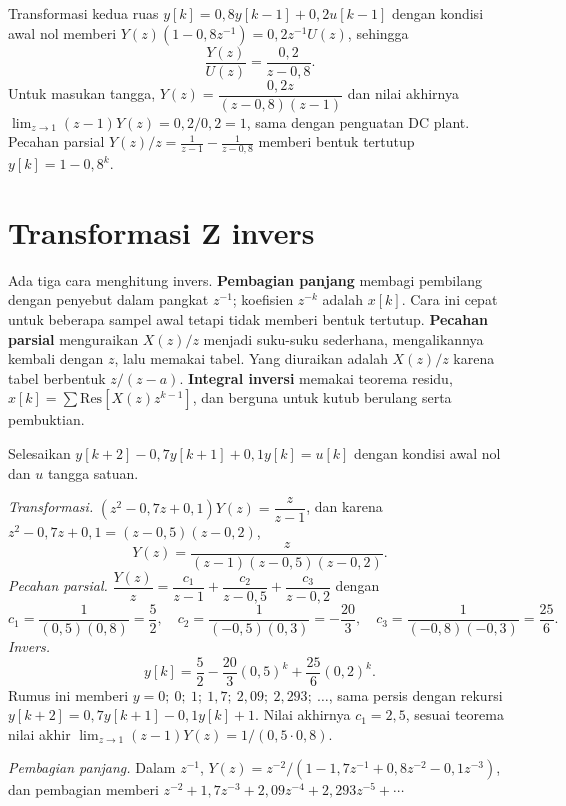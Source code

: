 \begin{contoh}
	Transformasi kedua ruas $y[k] = 0{,}8y[k-1] + 0{,}2u[k-1]$ dengan kondisi awal nol memberi $Y(z)(1 - 0{,}8z^{-1}) = 0{,}2z^{-1}U(z)$, sehingga
	\[
		\frac{Y(z)}{U(z)} = \frac{0{,}2}{z-0{,}8}.
	\]
	Untuk masukan tangga, $Y(z) = \dfrac{0{,}2z}{(z-0{,}8)(z-1)}$ dan nilai akhirnya $\lim_{z\to1}(z-1)Y(z) = 0{,}2/0{,}2 = 1$, sama dengan penguatan DC plant. Pecahan parsial $Y(z)/z = \frac{1}{z-1} - \frac{1}{z-0{,}8}$ memberi bentuk tertutup $y[k] = 1 - 0{,}8^k$.
\end{contoh}

\section{Transformasi Z invers}
Ada tiga cara menghitung invers. \textbf{Pembagian panjang} membagi pembilang dengan penyebut dalam pangkat $z^{-1}$; koefisien $z^{-k}$ adalah $x[k]$. Cara ini cepat untuk beberapa sampel awal tetapi tidak memberi bentuk tertutup. \textbf{Pecahan parsial} menguraikan $X(z)/z$ menjadi suku-suku sederhana, mengalikannya kembali dengan $z$, lalu memakai tabel. Yang diuraikan adalah $X(z)/z$ karena tabel berbentuk $z/(z-a)$. \textbf{Integral inversi} memakai teorema residu, $x[k] = \sum\text{Res}[X(z)z^{k-1}]$, dan berguna untuk kutub berulang serta pembuktian.

\begin{contoh}
	Selesaikan $y[k+2] - 0{,}7y[k+1] + 0{,}1y[k] = u[k]$ dengan kondisi awal nol dan $u$ tangga satuan.

	\textit{Transformasi.} $(z^2 - 0{,}7z + 0{,}1)Y(z) = \dfrac{z}{z-1}$, dan karena $z^2 - 0{,}7z + 0{,}1 = (z-0{,}5)(z-0{,}2)$,
	\[
		Y(z) = \frac{z}{(z-1)(z-0{,}5)(z-0{,}2)}.
	\]
	\textit{Pecahan parsial.} $\dfrac{Y(z)}{z} = \dfrac{c_1}{z-1} + \dfrac{c_2}{z-0{,}5} + \dfrac{c_3}{z-0{,}2}$ dengan
	\[
		c_1 = \frac{1}{(0{,}5)(0{,}8)} = \frac52,\quad c_2 = \frac{1}{(-0{,}5)(0{,}3)} = -\frac{20}{3},\quad c_3 = \frac{1}{(-0{,}8)(-0{,}3)} = \frac{25}{6}.
	\]
	\textit{Invers.}
	\[
		y[k] = \frac52 - \frac{20}{3}(0{,}5)^k + \frac{25}{6}(0{,}2)^k.
	\]
	Rumus ini memberi $y = 0;\ 0;\ 1;\ 1{,}7;\ 2{,}09;\ 2{,}293;\ \dots$, sama persis dengan rekursi $y[k+2] = 0{,}7y[k+1] - 0{,}1y[k] + 1$. Nilai akhirnya $c_1 = 2{,}5$, sesuai teorema nilai akhir $\lim_{z\to1}(z-1)Y(z) = 1/(0{,}5 \cdot 0{,}8)$.

	\textit{Pembagian panjang.} Dalam $z^{-1}$, $Y(z) = z^{-2}/(1 - 1{,}7z^{-1} + 0{,}8z^{-2} - 0{,}1z^{-3})$, dan pembagian memberi $z^{-2} + 1{,}7z^{-3} + 2{,}09z^{-4} + 2{,}293z^{-5} + \cdots$
\end{contoh}

